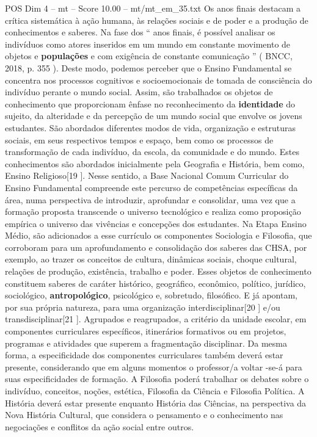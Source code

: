 \begin{textsample}{POS Dim 4 – mt – Score 10.00 – mt/mt\_em\_35.txt}
Os anos finais destacam a crítica sistemática à ação humana, às relações sociais e de poder e a produção de conhecimentos e saberes.
Na fase dos “ anos finais, é possível analisar os indivíduos como atores inseridos em um mundo em constante movimento de objetos e \textbf{populações} e com exigência de constante comunicação ” ( BNCC, 2018, p. 355 ).
Deste modo, podemos perceber que o Ensino Fundamental se concentra nos processos cognitivos e socioemocionais de tomada de consciência do indivíduo perante o mundo social.
Assim, são trabalhados os objetos de conhecimento que proporcionam ênfase no reconhecimento da \textbf{identidade} do sujeito, da alteridade e da percepção de um mundo social que envolve os jovens estudantes.
São abordados diferentes modos de vida, organização e estruturas sociais, em seus respectivos tempos e espaço, bem como os processos de transformação de cada indivíduo, da escola, da comunidade e do mundo.
Estes conhecimentos são abordados inicialmente pela Geografia e História, bem como, Ensino Religioso[19 ].
Nesse sentido, a Base Nacional Comum Curricular do Ensino Fundamental compreende este percurso de competências específicas da área, numa perspectiva de introduzir, aprofundar e consolidar, uma vez que a formação proposta transcende o universo tecnológico e realiza como proposição empírica o universo das vivências e concepções dos estudantes.
Na Etapa Ensino Médio, são adicionados a esse currículo os componentes Sociologia e Filosofia, que corroboram para um aprofundamento e consolidação dos saberes das CHSA, por exemplo, ao trazer os conceitos de cultura, dinâmicas sociais, choque cultural, relações de produção, existência, trabalho e poder.
Esses objetos de conhecimento constituem saberes de caráter histórico, geográfico, econômico, político, jurídico, sociológico, \textbf{antropológico}, psicológico e, sobretudo, filosófico.
E já apontam, por sua própria natureza, para uma organização interdisciplinar[20 ] e/ou transdisciplinar[21 ].
Agrupados e reagrupados, a critério da unidade escolar, em componentes curriculares específicos, itinerários formativos ou em projetos, programas e atividades que superem a fragmentação disciplinar.
Da mesma forma, a especificidade dos componentes curriculares também deverá estar presente, considerando que em alguns momentos o professor/a voltar -se-á para suas especificidades de formação.
A Filosofia poderá trabalhar os debates sobre o indivíduo, conceitos, noções, estética, Filosofia da Ciência e Filosofia Política.
A História deverá estar presente enquanto História das Ciências, na perspectiva da Nova História Cultural, que considera o pensamento e o conhecimento nas negociações e conflitos da ação social entre outros.

\end{textsample}
